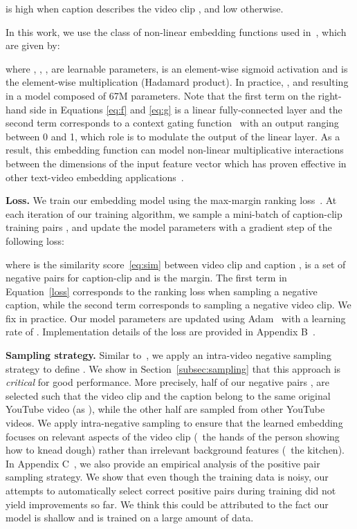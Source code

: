 \documentclass[10pt,twocolumn,letterpaper]{article}
\begin{document}
is high when caption  describes the video clip , and low otherwise.

In this work, we use the class of non-linear embedding functions used in~\cite{miech18learning}, which are given by:

where , , ,  are learnable parameters,
 is an element-wise sigmoid activation and
 is the element-wise multiplication (Hadamard product).
In practice, ,  and  resulting in a model composed of 67M parameters. 
Note that the first term on the right-hand side in Equations \eqref{eq:f} and \eqref{eq:g} is a linear fully-connected layer and the second term corresponds to a context gating function~\cite{miech17learnable} with an output ranging between 0 and 1, which role is to modulate the output of the linear layer.
As a result, this embedding function can model non-linear multiplicative interactions between the dimensions of the input feature vector which has proven effective in other text-video embedding applications~\cite{miech18learning}.

{\bf \noindent Loss.}
We train our embedding model using the max-margin ranking loss~\cite{karpathy14deepfragment,miech18learning,wang2018learning,wang2016learning,yu16videocaptioning}.
At each iteration of our training algorithm, we sample a mini-batch  of caption-clip training pairs , and update the model parameters with a gradient step of the following loss:
\label{loss}

where  is the similarity score~\eqref{eq:sim} between video clip  and caption ,  is a set of negative pairs for caption-clip  and  is the margin.
The first term in Equation~\eqref{loss} corresponds to the ranking loss when sampling a negative caption, while the second term corresponds to sampling a negative video clip.
We fix  in practice.
Our model parameters are updated using Adam~\cite{kingma15adam} with a learning rate of .
Implementation details of the loss are provided in Appendix B~\cite{miech19howto100m}.


{\bf \noindent Sampling strategy.}
Similar to~\cite{hendricks17localizing}, we apply an intra-video negative sampling strategy to define .
We show in Section~\ref{subsec:sampling} that this approach is \emph{critical} for good performance.
More precisely, half of our negative pairs , are selected such that the video clip  and the caption  belong to the same original YouTube video (as ), while the other half are sampled from other YouTube videos.
We apply intra-negative sampling to ensure that the learned embedding focuses on relevant aspects of the video clip (\eg~the hands of the person showing how to knead dough) rather than irrelevant background features (\eg~the kitchen).
In Appendix C~\cite{miech19howto100m}, we also provide an empirical analysis of the positive pair sampling strategy.
We show that even though the training data is noisy, our attempts to automatically select correct positive pairs during training did not yield improvements so far. We think this could be attributed to the fact our model is shallow and is trained on a large amount of data.
\end{document}
